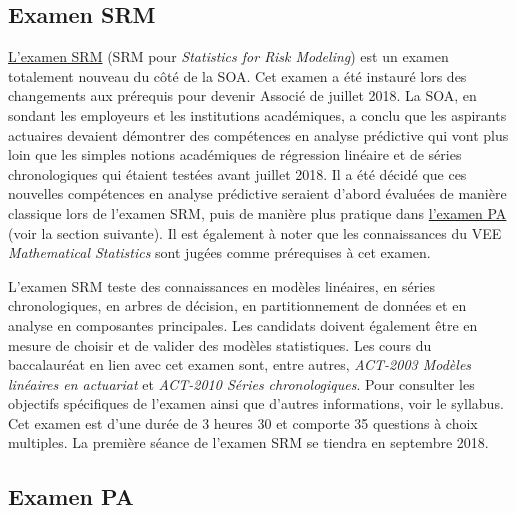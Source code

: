 \subsection*{Examen SRM}
\label{subsec:examsrm}

\href{https://www.soa.org/Education/Exam-Req/edu-exam-srm-detail.aspx}{L'examen SRM} (SRM pour \textit{Statistics for Risk Modeling}) est un examen totalement nouveau du côté de la SOA. Cet examen a été instauré lors des changements aux prérequis pour devenir Associé de juillet 2018. La SOA, en sondant les employeurs et les institutions académiques, a conclu que les aspirants actuaires devaient démontrer des compétences en analyse prédictive qui vont plus loin que les simples notions académiques de régression linéaire et de séries chronologiques qui étaient testées avant juillet 2018. Il a été décidé que ces nouvelles compétences en analyse prédictive seraient d'abord évaluées de manière classique lors de l'examen SRM, puis de manière plus pratique dans \href{https://www.soa.org/Education/Exam-Req/edu-exam-pa-detail.aspx}{l'examen PA} (voir la section suivante). Il est également à noter que les connaissances du VEE \textit{Mathematical Statistics} sont jugées comme prérequises à cet examen. \vspace{\baselineskip}

L'examen SRM teste des connaissances en modèles linéaires, en séries chronologiques, en arbres de décision, en partitionnement de données et en analyse en composantes principales. Les candidats doivent également être en mesure de choisir et de valider des modèles statistiques. Les cours du baccalauréat en lien avec cet examen sont, entre autres, \textit{ACT-2003 Modèles linéaires en actuariat} et \textit{ACT-2010 Séries chronologiques}. Pour consulter les objectifs spécifiques de l'examen ainsi que d'autres informations, voir le syllabus. Cet examen est d'une durée de 3 heures 30 et comporte 35 questions à choix multiples. La première séance de l'examen SRM se tiendra en septembre 2018. \vspace{\baselineskip}



\subsection*{Examen PA}
\label{subsec:exampa}

